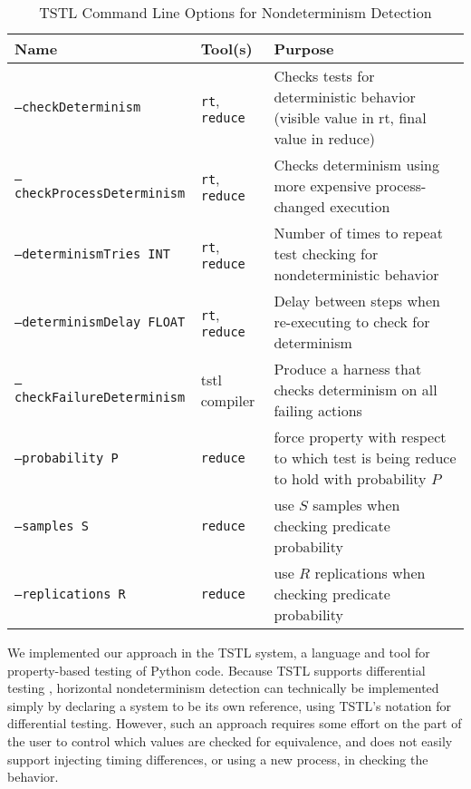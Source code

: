 \begin{table*}
\centering
{%
\caption{TSTL Command Line Options for
  Nondeterminism Detection}
\label{tab:options}
\begin{tabular}{l|l|l}
Name &  Tool(s) & Purpose \\
\hline
\hline
{\tt --checkDeterminism} & {\tt rt}, {\tt reduce} & Checks tests for deterministic
                                  behavior (visible value in rt, final
  value in reduce)\\
\hline
{\tt --checkProcessDeterminism} & {\tt rt}, {\tt reduce} & Checks determinism using more 
                                         expensive process-changed 
                                         execution \\
\hline
{\tt --determinismTries INT} & {\tt rt}, {\tt reduce} & Number of times to repeat test 
                                  checking for nondeterministic
                                  behavior \\
\hline 
{\tt --determinismDelay FLOAT} & {\tt rt}, {\tt reduce} & Delay between steps when 
                                  re-executing to check for
                                              determinism \\
\hline 
{\tt --checkFailureDeterminism} & tstl compiler & Produce a harness
                                                  that checks
                                                  determinism on all
                                                  failing actions \\
\hline 
{\tt --probability P} & {\tt reduce} & force property with respect to which 
                               test is being reduce to hold with 
                                 probability $P$ \\
\hline 
{\tt --samples S} & {\tt reduce} & use $S$ samples when checking predicate
                             probability\\
\hline 
{\tt --replications R} & {\tt reduce} & use $R$ replications when checking predicate probability\\
\hline
\hline

\end{tabular}
}
\end{table*}


We implemented our approach in the TSTL \cite{NFM15} system, a
language and tool for property-based testing of Python code.
Because TSTL supports differential testing \cite{tstlsttt}, horizontal
nondeterminism detection can technically be implemented simply by
declaring a system to be its own reference, using TSTL's notation for
differential testing.  However, such an approach requires some effort
on the part of the user to control which values are checked for
equivalence, and does not easily support injecting timing differences,
or using a new process, in checking the behavior.

